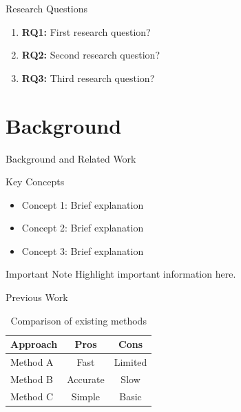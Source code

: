 \documentclass[aspectratio=169]{beamer}
\begin{document}
\begin{frame}{Research Questions}
    \begin{enumerate}
        \item \textbf{RQ1:} First research question?
        \item \textbf{RQ2:} Second research question?
        \item \textbf{RQ3:} Third research question?
    \end{enumerate}
\end{frame}


\section{Background}

\begin{frame}{Background and Related Work}
    \begin{block}{Key Concepts}
        \begin{itemize}
            \item Concept 1: Brief explanation
            \item Concept 2: Brief explanation
            \item Concept 3: Brief explanation
        \end{itemize}
    \end{block}
    
    \vspace{0.3cm}
    
    \begin{alertblock}{Important Note}
        Highlight important information here.
    \end{alertblock}
\end{frame}

\begin{frame}{Previous Work}
    \begin{table}
        \centering
        \begin{tabular}{lcc}
            \toprule
            \textbf{Approach} & \textbf{Pros} & \textbf{Cons} \\
            \midrule
            Method A & Fast & Limited \\
            Method B & Accurate & Slow \\
            Method C & Simple & Basic \\
            \bottomrule
        \end{tabular}
        \caption{Comparison of existing methods}
    \end{table}
\end{frame}
\end{document}
